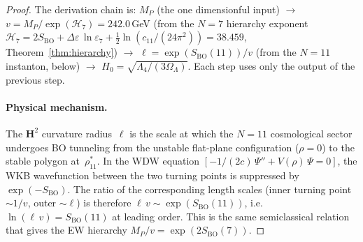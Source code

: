 \begin{proof}
The derivation chain is:
$M_P$ (the one dimensionful input) $\to$
$v = M_P/\exp(\mathcal{H}_7) = 242.0$\,GeV
(from the $N = 7$ hierarchy exponent
$\mathcal{H}_7 = 2S_{\mathrm{BO}}
+ \Delta\varepsilon\,\ln\varepsilon_7
+ \tfrac{1}{2}\ln(c_{11}/(24\pi^2)) = 38.459$,
Theorem~\ref{thm:hierarchy})
$\to$ $\ell = \exp(S_{\mathrm{BO}}(11))/v$
(from the $N = 11$ instanton, below)
$\to$ $H_0 = \sqrt{\Lambda_4/(3\Omega_\Lambda)}$.
Each step uses only the output of the previous step.

\paragraph{Physical mechanism.}
The $\mathbf{H}^2$ curvature radius~$\ell$ is the scale at which
the $N = 11$ cosmological sector undergoes BO tunneling from the
unstable flat-plane configuration ($\rho = 0$) to the stable
polygon at~$\rho^*_{11}$.
In the WDW equation $[-1/(2c)\,\Psi'' + V(\rho)\,\Psi = 0]$,
the WKB wavefunction between the two turning points
is suppressed by $\exp(-S_{\mathrm{BO}})$.
The ratio of the corresponding length scales
(inner turning point $\sim 1/v$, outer $\sim \ell$) is
therefore $\ell\,v \sim \exp(S_{\mathrm{BO}}(11))$, i.e.\
$\ln(\ell\,v) = S_{\mathrm{BO}}(11)$ at leading order.
This is the same semiclassical relation that gives
the EW hierarchy $M_P/v = \exp(2S_{\mathrm{BO}}(7))$.


\end{proof}
